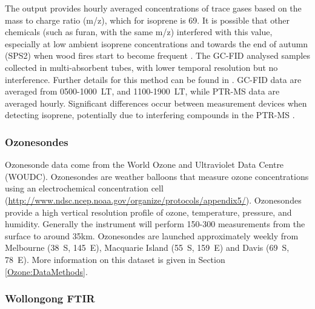       The output provides hourly averaged concentrations of trace gases based on the mass to charge ratio (m/z), which for isoprene is 69.
      It is possible that other chemicals (such as furan, with the same m/z) interfered with this value, especially at low ambient isoprene concentrations and towards the end of autumn (SPS2) when wood fires start to become frequent \parencite{Guerette2018}.
      The GC-FID analysed samples collected in multi-absorbent tubes, with lower temporal resolution but no interference. 
      Further details for this method can be found in \textcite{Cheng2016}.
      GC-FID data are averaged from 0500-1000~LT, and 1100-1900~LT, while PTR-MS data are averaged hourly.
      Significant differences occur between measurement devices when detecting isoprene, potentially due to interfering compounds in the PTR-MS \parencite{Dunne2018}.
      
      
    \subsubsection{Ozonesondes}
    \label{Model:datasets:ozonesondes}
    
      Ozonesonde data come from the World Ozone and Ultraviolet Data Centre (WOUDC).
      Ozonesondes are weather balloons that measure ozone concentrations using an electrochemical concentration cell (\url{http://www.ndsc.ncep.noaa.gov/organize/protocols/appendix5/}).
      Ozonesondes provide a high vertical resolution profile of ozone, temperature, pressure, and humidity.
      Generally the instrument will perform 150-300 measurements from the surface to around 35km.
      Ozonesondes are launched approximately weekly from Melbourne (38\degr ~S, 145\degr ~E), Macquarie Island (55\degr ~S, 159\degr ~E) and Davis (69\degr ~S, 78\degr ~E). 
      More information on this dataset is given in Section \ref{Ozone:DataMethods}.
    
    \subsubsection{Wollongong FTIR}
    \label{Model:datasets:wollongong_ftir}
    
